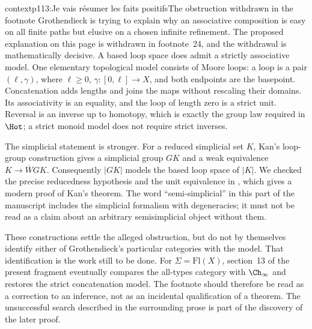 \begin{dcomment}{context}{p113:Je vais résumer les faits positifs}{The obstruction withdrawn in the footnote}
Grothendieck is trying to explain why an associative composition is easy on all finite paths but elusive on a chosen infinite refinement. The proposed explanation on this page is withdrawn in footnote~24, and the withdrawal is mathematically decisive. A based loop space does admit a strictly associative model. One elementary topological model consists of Moore loops: a loop is a pair $(\ell,\gamma)$, where $\ell\geq0$, $\gamma:[0,\ell]\to X$, and both endpoints are the basepoint. Concatenation adds lengths and joins the maps without rescaling their domains. Its associativity is an equality, and the loop of length zero is a strict unit. Reversal is an inverse up to homotopy, which is exactly the group law required in $\Hot$; a strict monoid model does not require strict inverses.

The simplicial statement is stronger. For a reduced simplicial set $K$, Kan's loop-group construction gives a simplicial group $GK$ and a weak equivalence $K\to\overline W GK$. Consequently $|GK|$ models the based loop space of $|K|$. We checked the precise reducedness hypothesis and the unit equivalence in \citet[Theorem~21]{Stevenson2012}, which gives a modern proof of Kan's theorem. The word ``semi-simplicial'' in this part of the manuscript includes the simplicial formalism with degeneracies; it must not be read as a claim about an arbitrary semisimplicial object without them.

These constructions settle the alleged obstruction, but do not by themselves identify either of Grothendieck's particular categories with the model. That identification is the work still to be done. For $\Sigma=\mathrm{Fl}(X)$, section~13 of the present fragment eventually compares the all-types category with $\Ch_\infty$ and restores the strict concatenation model. The footnote should therefore be read as a correction to an inference, not as an incidental qualification of a theorem. The unsuccessful search described in the surrounding prose is part of the discovery of the later proof.
\end{dcomment}
